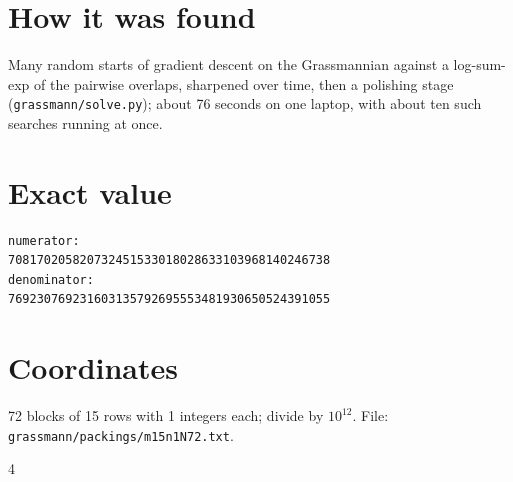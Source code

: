 \documentclass[11pt,a4paper]{article}
\begin{document}
\section{How it was found}
Many random starts of gradient descent on the Grassmannian against a log-sum-exp of the pairwise overlaps, sharpened over time, then a polishing stage (\texttt{grassmann/solve.py}); about 76 seconds on one laptop, with about ten such searches running at once.


\appendix
\section{Exact value}
{\small
\begin{verbatim}
numerator:
708170205820732451533018028633103968140246738
denominator:
769230769231603135792695553481930650524391055
\end{verbatim}}

\section{Coordinates}
72 blocks of 15 rows with 1 integers each; divide by $10^{12}$. File: \texttt{grassmann/packings/m15n1N72.txt}.
{\tiny
\begin{multicols}{4}
\end{multicols}}
\end{document}
